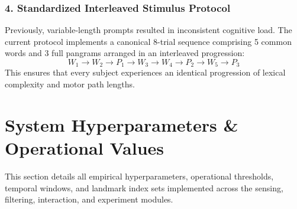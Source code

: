 \documentclass[11pt,a4paper]{article}
\begin{document}
\subsubsection{4. Standardized Interleaved Stimulus Protocol}
Previously, variable-length prompts resulted in inconsistent cognitive load. The current protocol implements a canonical 8-trial sequence comprising 5 common words and 3 full pangrams arranged in an interleaved progression:
\begin{equation}
W_1 \rightarrow W_2 \rightarrow P_1 \rightarrow W_3 \rightarrow W_4 \rightarrow P_2 \rightarrow W_5 \rightarrow P_3
\end{equation}
This ensures that every subject experiences an identical progression of lexical complexity and motor path lengths.

\section{System Hyperparameters \& Operational Values}

This section details all empirical hyperparameters, operational thresholds, temporal windows, and landmark index sets implemented across the sensing, filtering, interaction, and experiment modules.
\end{document}
